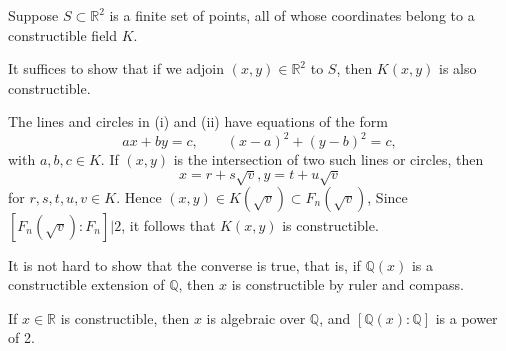 \documentclass[12pt]{article}
\begin{document}
\begin{proofbox}
	Suppose $S \subset \mathbb{R}^2$ is a finite set of points, all of whose coordinates belong to a constructible field $K$.

	It suffices to show that if we adjoin $(x, y) \in \mathbb{R}^2$ to $S$, then $K(x, y)$ is also constructible.

	The lines and circles in (i) and (ii) have equations of the form
	\[
	ax + by = c, \qquad (x - a)^2 + (y-b)^2 = c,
	\]
	with $a, b, c \in K$. If $(x, y)$ is the intersection of two such lines or circles, then
	\[
	x = r + s\sqrt v, y = t + u \sqrt v
	\]
	for $r, s, t, u, v \in K$. Hence $(x, y) \in K(\sqrt v) \subset F_n(\sqrt v)$, Since $[F_n(\sqrt v) : F_n] | 2$, it follows that $K(x, y)$ is constructible.
\end{proofbox}

\begin{remark}
	It is not hard to show that the converse is true, that is, if $\mathbb{Q}(x)$ is a constructible extension of $\mathbb{Q}$, then $x$ is constructible by ruler and compass.
\end{remark}

\begin{corollary}
	If $x \in \mathbb{R}$ is constructible, then $x$ is algebraic over $\mathbb{Q}$, and $[\mathbb{Q}(x) : \mathbb{Q}]$ is a power of 2.
\end{corollary}
\end{document}

